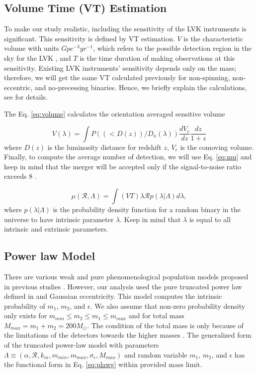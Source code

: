 \documentclass[twocolumn,prd,nofootinbib]{revtex4}
\begin{document}
\subsection{Volume Time (VT) Estimation}

To make our study realistic, including the sensitivity of the LVK instruments is significant. This sensitivity is defined by VT estimation. $V$ is the characteristic volume with units $Gpc^{-3}yr^{-1}$, which refers to the possible detection region in the sky for the LVK \cite{Volume_1993}, and $T$ is the time duration of making observations at this sensitivity.
Existing LVK instruments' sensitivity depends only on the mass; therefore, we will get the same VT calculated previously \cite{Dan_2019} for non-spinning, non-eccentric, and no-precessing binaries. Hence, we briefly explain the calculations, see \cite{Dan_2019} for details.

The Eq. \ref{eq:volume} calculates the orientation averaged sensitive volume \cite{Abbott_2016,richard2010volume}

\begin{equation}
\label{eq:volume}
V(\lambda) = \int P((<D(z))/D_n(\lambda))\frac{dV_c}{dz}\frac{dz}{1+z}
\end{equation}    
where $D(z)$ is the luminosity distance for redshift $z$, $V_c$ is the comoving volume. Finally, to compute the average number of detection, we will use Eq. \ref{eq:mu} and keep in mind that the merger will be accepted only if the signal-to-noise ratio exceeds 8 \cite{SNR_2010}.

\begin{equation}
\label{eq:mu}
  \mu(\mathcal{R},\Lambda) = \int(VT)\lambda \mathcal{R}p(\lambda|\Lambda)d\lambda ,
\end{equation}
where $p(\lambda|\Lambda)$ is the probability density function for a random binary in the universe to have intrinsic parameter $\lambda$. Keep in mind that $\lambda$ is equal to all intrinsic and extrinsic parameters.


\subsection{Power law Model}
There are various weak and pure phenomenological population models proposed in previous studies \cite{2016PRXAbbot_BBH_model,2017FishBach_BBH_model,2018talbot_bbh_model}. However, our analysis used the pure truncated power law defined in \cite{2016PRXAbbot_BBH_model,2017FishBach_BBH_model} and Gaussian eccentricity. This model computes the intrinsic probability of $m_1$, $m_2$, and $\epsilon$.  
We also assume that non-zero probability density only exists for $m_{min}\leq m_2 \leq m_1 \leq m_{max}$ and for total mass $M_{max}=m_1+m_2 = 200 M_\odot$. The condition of the total mass is only because of the limitations of the detectors towards the higher masses \cite{2016PRXAbbot_BBH_model}. The generalized form of the truncated power-law model with parameters $\Lambda \equiv  (\alpha, \mathcal{R}, k_m, m_{min}, m_{max}, \sigma_\epsilon, M_{max})$ and random variable $m_1$, $m_2$, and $\epsilon$ has the functional form in Eq. \ref{eq:plawg} within provided mass limit.
\end{document}
